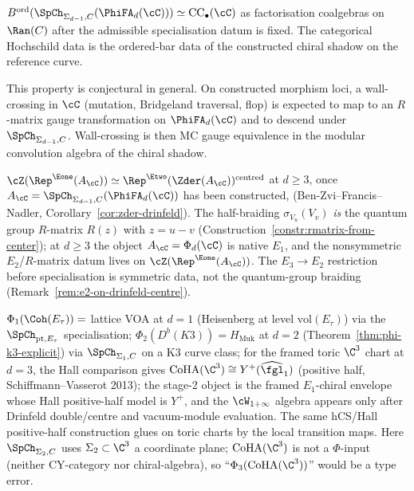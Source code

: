 \begin{description}[itemsep=2pt,leftmargin=1.8em,style=nextline]
\item[(U1) Hochschild pullback.]
$B^{\mathrm{ord}}(\SpCh_{\Sigma_{d-1}, C}(\PhiFA_d(\cC)))
\simeq \mathrm{CC}_\bullet(\cC)$ as factorisation coalgebras
on $\Ran(C)$ after the admissible specialisation datum is fixed. The
categorical Hochschild data is the ordered-bar data of the constructed
chiral shadow on the reference curve.
\item[(U2) CY-morphism functoriality.]
This property is conjectural in general. On constructed morphism loci, a
wall-crossing in $\cC$ (mutation, Bridgeland traversal, flop) is expected
to map to an $R$-matrix gauge transformation on $\PhiFA_d(\cC)$ and to
descend under $\SpCh_{\Sigma_{d-1}, C}$. Wall-crossing is then MC gauge
equivalence in the modular convolution algebra of the chiral shadow.
\item[(U3) Drinfeld-centre compatibility.]
$\cZ(\Rep^{\Eone}(A_\cC)) \simeq
\Rep^{\Etwo}(\Zder(A_\cC))^{\mathrm{centred}}$ at $d \ge 3$, once
$A_\cC=\SpCh_{\Sigma_{d-1},C}(\PhiFA_d(\cC))$ has been constructed,
(Ben-Zvi--Francis--Nadler,
Corollary~\ref{cor:zder-drinfeld}). The half-braiding
$\sigma_{V_u}(V_v)$ \emph{is} the quantum group $R$-matrix
$R(z)$ with $z = u - v$
(Construction~\ref{constr:rmatrix-from-center});
at $d \geq 3$ the object $A_\cC=\Phi_d(\cC)$ is native $E_1$,
and the nonsymmetric $E_2$/$R$-matrix datum lives on
$\cZ(\Rep^{\Eone}(A_\cC))$. The $E_3 \to E_2$ restriction before
specialisation is symmetric data, not the quantum-group braiding
(Remark~\ref{rem:e2-on-drinfeld-centre}).
\item[(U4) Standard-input recovery.]
$\Phi_1(\Coh(E_\tau)) = $ lattice VOA at $d = 1$
(Heisenberg at level $\mathrm{vol}(E_\tau)$) via the
$\SpCh_{\mathrm{pt}, E_\tau}$ specialisation;
$\Phi_2(D^b(K3)) = H_{\mathrm{Muk}}$ at $d = 2$
(Theorem~\ref{thm:phi-k3-explicit}) via
$\SpCh_{\Sigma_1, C}$ on a K3 curve class;
for the framed toric $\C^3$ chart at $d=3$, the Hall comparison gives
$\CoHA(\C^3) \cong Y^+(\widehat{\fgl}_1)$ (positive half,
Schiffmann--Vasserot 2013); the stage-2 object is the framed
$E_1$-chiral envelope whose Hall positive-half model is $Y^+$, and the
$\cW_{1+\infty}$ algebra appears only after Drinfeld double/centre and
vacuum-module evaluation. The same hCS/Hall positive-half construction
glues on toric charts by the local transition maps. Here
$\SpCh_{\Sigma_2, C}$ uses
$\Sigma_2 \subset \C^3$ a coordinate plane; $\CoHA(\C^3)$ is not a
$\Phi$-input (neither CY-category nor chiral-algebra), so
``$\Phi_3(\CoHA(\C^3))$'' would be a type error.
\end{description}

